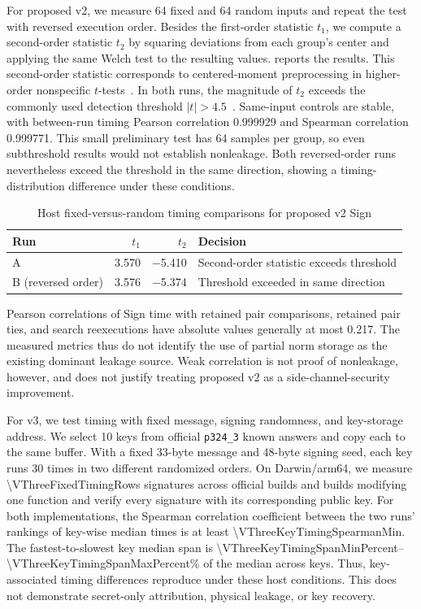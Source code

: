 \documentclass[a4paper,10pt]{article}
\theoremstyle{definition}
\theoremstyle{remark}
\begin{document}
For proposed v2, we measure 64 fixed and 64 random inputs and repeat the test with reversed execution order. Besides the first-order statistic $t_1$, we compute a second-order statistic $t_2$ by squaring deviations from each group's center and applying the same Welch test to the resulting values.  reports the results. This second-order statistic corresponds to centered-moment preprocessing in higher-order nonspecific $t$-tests~\cite{schneider-moradi-2016}. In both runs, the magnitude of $t_2$ exceeds the commonly used detection threshold $|t|>4.5$~\cite{schneider-moradi-2016}. Same-input controls are stable, with between-run timing Pearson correlation \num{0.999929} and Spearman correlation \num{0.999771}. This small preliminary test has 64 samples per group, so even subthreshold results would not establish nonleakage. Both reversed-order runs nevertheless exceed the threshold in the same direction, showing a timing-distribution difference under these conditions.

\begin{table}[H]
  \centering
  \caption{Host fixed-versus-random timing comparisons for proposed v2 Sign}
  \label{tab:timing-test}
  \small
  \begin{tabular}{@{}lrrl@{}}
    \toprule
    Run & $t_1$ & $t_2$ & Decision \\
    \midrule
    A & \num{3.570} & \num{-5.410} & Second-order statistic exceeds threshold \\
    B (reversed order) & \num{3.576} & \num{-5.374} & Threshold exceeded in same direction \\
    \bottomrule
  \end{tabular}
\end{table}

Pearson correlations of Sign time with retained pair comparisons, retained pair ties, and search reexecutions have absolute values generally at most \num{0.217}. The measured metrics thus do not identify the use of partial norm storage as the existing dominant leakage source. Weak correlation is not proof of nonleakage, however, and does not justify treating proposed v2 as a side-channel-security improvement.

For v3, we test timing with fixed message, signing randomness, and key-storage address. We select 10 keys from official \texttt{p324\_3} known answers and copy each to the same buffer. With a fixed 33-byte message and 48-byte signing seed, each key runs 30 times in two different randomized orders. On Darwin/arm64, we measure \num{\VThreeFixedTimingRows} signatures across official builds and builds modifying one function and verify every signature with its corresponding public key. For both implementations, the Spearman correlation coefficient between the two runs' rankings of key-wise median times is at least \num{\VThreeKeyTimingSpearmanMin}. The fastest-to-slowest key median span is \num{\VThreeKeyTimingSpanMinPercent}--\num{\VThreeKeyTimingSpanMaxPercent}\% of the median across keys. Thus, key-associated timing differences reproduce under these host conditions. This does not demonstrate secret-only attribution, physical leakage, or key recovery.
\end{document}
